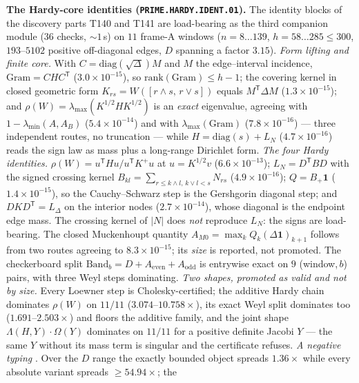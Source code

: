 \documentclass[11pt,a4paper]{article}
\theoremstyle{definition}
\begin{document}
\par\smallskip\noindent\textbf{The Hardy-core identities
(\texttt{PRIME.HARDY.IDENT.01}).}
The identity blocks of the discovery parts T140 and T141 are load-bearing as the
third companion module ($36$ checks, ${\sim}1$\,s) on $11$ frame-A windows ($n=8\ldots139$, $h=58\ldots285\le300$,
$193$--$5102$ positive off-diagonal edges, $D$ spanning a factor $3.15$).
\emph{Form lifting and finite core.} With $C=\mathrm{diag}(\sqrt\Delta)M$ and $M$
the edge--interval incidence, $\mathrm{Gram}=CHC^{\mathsf T}$
($3.0\times10^{-15}$), so $\mathrm{rank}(\mathrm{Gram})\le h-1$; the covering
kernel in closed geometric form $K_{rs}=W([r\wedge s,\,r\vee s])$ equals
$M^{\mathsf T}\Delta M$ ($1.3\times10^{-15}$); and
$\rho(W)=\lambda_{\max}(K^{1/2}HK^{1/2})$ is an \emph{exact} eigenvalue, agreeing
with $1-\lambda_{\min}(A,A_B)$ ($5.4\times10^{-14}$) and with
$\lambda_{\max}(\mathrm{Gram})$ ($7.8\times10^{-16}$) --- three independent routes,
no truncation --- while $H=\mathrm{diag}(s)+L_N$ ($4.7\times10^{-16}$) reads the
sign law as mass plus a long-range Dirichlet form.
\emph{The four Hardy identities.} $\rho(W)=u^{\mathsf T}Hu/u^{\mathsf T}K^{+}u$ at
$u=K^{1/2}v$ ($6.6\times10^{-13}$); $L_N=D^{\mathsf T}BD$ with the signed crossing
kernel $B_{kl}=\sum_{r\le k\wedge l,\,k\vee l<s}N_{rs}$ ($4.9\times10^{-16}$);
$Q=B_+\mathbf 1$ ($1.4\times10^{-15}$), so the Cauchy--Schwarz step is the
Gershgorin diagonal step; and $DKD^{\mathsf T}=L_\Delta$ on the interior nodes
($2.7\times10^{-14}$), whose diagonal is the endpoint edge mass. The crossing
kernel of $|N|$ does \emph{not} reproduce $L_N$: the signs are load-bearing. The
closed Muckenhoupt quantity $A_{M0}=\max_kQ_k(\Delta\mathbf 1)_{k+1}$ follows from
two routes agreeing to $8.3\times10^{-15}$; its \emph{size} is reported, not
promoted. The checkerboard split $\mathrm{Band}_b=D+A_{\mathrm{even}}+A_{\mathrm{odd}}$
is entrywise exact on $9$ (window,\,$b$) pairs, with three Weyl steps dominating.
\emph{Two shapes, promoted as valid and not by size.} Every Loewner step is
Cholesky-certified; the additive Hardy chain dominates $\rho(W)$ on $11/11$
($3.074$--$10.758\times$), its exact Weyl split dominates too
($1.691$--$2.503\times$) and floors the additive family, and the joint shape
$\Lambda(H,Y)\cdot\Omega(Y)$ dominates on $11/11$ for a positive definite Jacobi
$Y$ --- the same $Y$ without its mass term is singular and the certificate refuses.
\emph{A negative typing} \mX. Over the $D$ range the exactly bounded object
spreads $1.36\times$ while every absolute variant spreads $\ge54.94\times$; the
\end{document}

